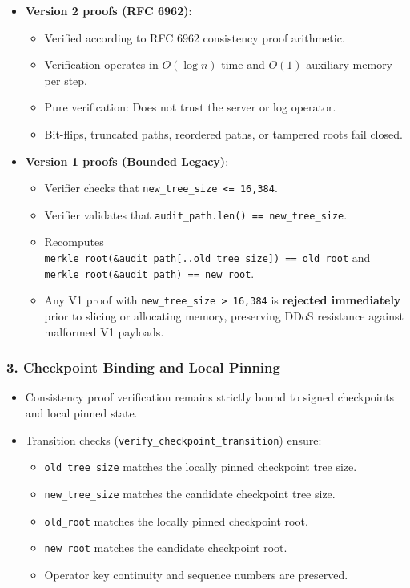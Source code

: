 \documentclass[
]{article}
\providecommand{\tightlist}{%
  \setlength{\itemsep}{0pt}\setlength{\parskip}{0pt}}
\begin{document}
\begin{itemize}
\tightlist
\item
  \textbf{Version 2 proofs (RFC 6962)}:

  \begin{itemize}
  \tightlist
  \item
    Verified according to RFC 6962 consistency proof arithmetic.
  \item
    Verification operates in \(O(\log n)\) time and \(O(1)\) auxiliary
    memory per step.
  \item
    Pure verification: Does not trust the server or log operator.
  \item
    Bit-flips, truncated paths, reordered paths, or tampered roots fail
    closed.
  \end{itemize}
\item
  \textbf{Version 1 proofs (Bounded Legacy)}:

  \begin{itemize}
  \tightlist
  \item
    Verifier checks that \texttt{new\_tree\_size\ \textless{}=\ 16,384}.
  \item
    Verifier validates that
    \texttt{audit\_path.len()\ ==\ new\_tree\_size}.
  \item
    Recomputes
    \texttt{merkle\_root(\&audit\_path{[}..old\_tree\_size{]})\ ==\ old\_root}
    and \texttt{merkle\_root(\&audit\_path)\ ==\ new\_root}.
  \item
    Any V1 proof with \texttt{new\_tree\_size\ \textgreater{}\ 16,384}
    is \textbf{rejected immediately} prior to slicing or allocating
    memory, preserving DDoS resistance against malformed V1 payloads.
  \end{itemize}
\end{itemize}

\hypertarget{checkpoint-binding-and-local-pinning}{%
\subsubsection{3. Checkpoint Binding and Local
Pinning}\label{checkpoint-binding-and-local-pinning}}

\begin{itemize}
\tightlist
\item
  Consistency proof verification remains strictly bound to signed
  checkpoints and local pinned state.
\item
  Transition checks (\texttt{verify\_checkpoint\_transition}) ensure:

  \begin{itemize}
  \tightlist
  \item
    \texttt{old\_tree\_size} matches the locally pinned checkpoint tree
    size.
  \item
    \texttt{new\_tree\_size} matches the candidate checkpoint tree size.
  \item
    \texttt{old\_root} matches the locally pinned checkpoint root.
  \item
    \texttt{new\_root} matches the candidate checkpoint root.
  \item
    Operator key continuity and sequence numbers are preserved.
  \end{itemize}
\end{itemize}
\end{document}
